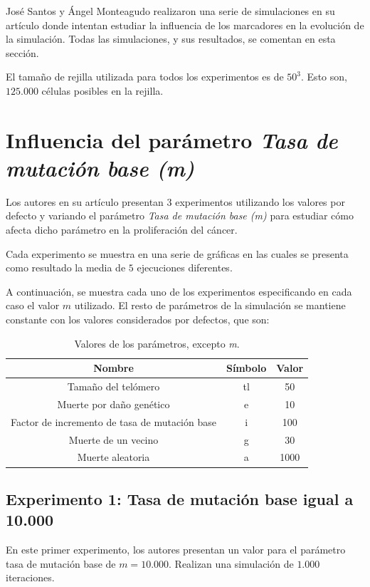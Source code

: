 José Santos y Ángel Monteagudo realizaron una serie de simulaciones en su artículo
donde intentan estudiar la influencia de los marcadores en la evolución de la simulación.
Todas las simulaciones, y sus resultados, se comentan en esta sección.

El tamaño de rejilla utilizada para todos los experimentos es de $50^3$. Esto son,
$125.000$ células posibles en la rejilla.

\section{Influencia del parámetro \textit{Tasa de mutación base (m)}}

Los autores en su artículo presentan $3$ experimentos utilizando los valores por defecto
y variando el parámetro \textit{Tasa de mutación base (m)} para estudiar cómo afecta
dicho parámetro en la proliferación del cáncer.

Cada experimento se muestra en una serie de gráficas en las cuales se presenta
como resultado la media de $5$ ejecuciones diferentes.

A continuación, se muestra cada uno de los experimentos especificando en cada caso
el valor $m$ utilizado. El resto de parámetros de la simulación se mantiene constante
con los valores considerados por defectos, que son:

\begin{table}[h!]
  \centering
  \caption{Valores de los parámetros, excepto \textit{m}.}
  \label{tab:table1}
  \begin{tabular}{ccc}
    \toprule
    Nombre & Símbolo & Valor\\
    \midrule
    Tamaño del telómero & tl & 50\\
    Muerte por daño genético & e & 10\\
    Factor de incremento de tasa de mutación base & i & 100\\
    Muerte de un vecino & g & 30\\
    Muerte aleatoria & a & 1000\\
    \bottomrule
  \end{tabular}
\end{table}

\subsection{Experimento 1: Tasa de mutación base igual a 10.000}

En este primer experimento, los autores presentan un valor para el parámetro
tasa de mutación base de $m=10.000$. Realizan una simulación de $1.000$ iteraciones.

